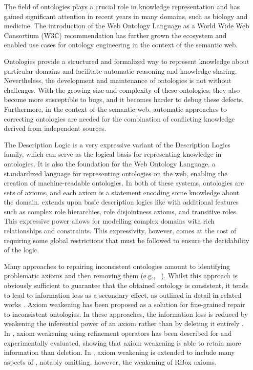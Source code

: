 
The field of ontologies plays a crucial role in knowledge representation and has gained significant attention in recent years in many domains, such as biology and medicine. The introduction of the Web Ontology Language as a World Wide Web Consortium (W3C) recommendation has further grown the ecosystem and enabled use cases for ontology engineering in the context of the semantic web.

Ontologies provide a structured and formalized way to represent knowledge about particular domains and facilitate automatic reasoning and knowledge sharing. Nevertheless, the development and maintenance of ontologies is not without challenges. With the growing size and complexity of these ontologies, they also become more susceptible to bugs, and it becomes harder to debug these defects. Furthermore, in the context of the semantic web, automatic approaches to correcting ontologies are needed for the combination of conflicting knowledge derived from independent sources.

The \SROIQ Description Logic is a very expressive variant of the Description Logics family, which can serve as the logical basis for representing knowledge in ontologies. It is also the foundation for the Web Ontology Language, a standardized language for representing ontologies on the web, enabling the creation of machine-readable ontologies. In both of these systems, ontologies are sets of axioms, and each axiom is a statement encoding some knowledge about the domain. \SROIQ extends upon basic description logics like \ALC with additional features such as complex role hierarchies, role disjointness axioms, and transitive roles. This expressive power allows for modelling complex domains with rich relationships and constraints. This expressivity, however, comes at the cost of requiring some global restrictions that must be followed to ensure the decidability of the logic.

Many approaches to repairing inconsistent ontologies amount to identifying problematic axioms and then removing them (e.g., ~\cite{schlobach2003non,kalyanpur2005debugging,kalyanpur2006repairing,BaPS07}). Whilst this approach is obviously sufficient to guarantee that the obtained ontology is consistent, it tends to lead to information loss as a secondary effect, as outlined in detail in related works \cite{troquard2018repairing,confalonieri2020towards}. 
Axiom weakening has been proposed as a solution for fine-grained repair to inconsistent ontologies. In these approaches, the information loss is reduced by weakening the inferential power of an axiom rather than by deleting it entirely \cite{du2014practical,AMAI-2018,baader2018making,troquard2018repairing,confalonieri2020towards}. 
%
In \cite{troquard2018repairing}, axiom weakening using refinement operators has been described for \ALC and experimentally evaluated, showing that axiom weakening is able to retain more information than deletion. In \cite{confalonieri2020towards}, axiom weakening is extended to include many aspects of \SROIQ, notably omitting, however, the weakening of RBox axioms.

